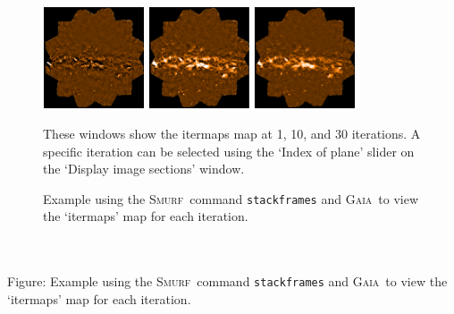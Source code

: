 \documentclass[twoside,11pt]{article}
\newcommand{\htmladdimg}[1]{}
\newenvironment{latexonly}{}{}
\newcommand{\xref}[3]{#1}
\renewcommand{\_}{\texttt{\symbol{95}}}
\newenvironment{fmpage}[1]{\begin{lrbox}{\fmbox}\begin{minipage}{#1}}{\end{minipage}\end{lrbox}\fbox{\usebox{\fmbox}}}
\newcommand{\gaia}{\xref{\textsc{Gaia}}{sun214}{}}
\newcommand{\smurf}{\xref{\textsc{Smurf}}{sun258}{}}
\begin{document}
\begin{latexonly}
\begin{figure}[ht!]
\begin{center}
\begin{fmpage}{0.95\linewidth}
\begin{minipage}[c]{0.65\linewidth}
\centering
\hspace{0.5mm}
\includegraphics[width=3cm, height=3cm]{sc21_iter1.eps}
\includegraphics[width=3cm, height=3cm]{sc21_iter2.eps}
\includegraphics[width=3cm, height=3cm]{sc21_iter31.eps}
\vspace{0.2cm}
\end{minipage}
\hspace{0.3cm}
\begin{minipage}[c]{0.29\linewidth}
These windows show the itermaps map at 1, 10, and 30 iterations. A
specific iteration can be selected using the `Index of plane' slider
on the `Display image sections' window.
\vspace{0.2cm}
\end{minipage}

\end{fmpage}
\end{center}
\caption{\small Example using the \smurf\ command \texttt{stackframes} and
\gaia\ to view the `itermaps' map for each iteration.}
\label{fig:stack}
\end{figure}
\end{latexonly}

\begin{htmlonly}
 \label{fig:stack} \htmladdimg{sc21_view_itermaps.png}
 \\ \\
 Figure: Example using the \smurf\ command \texttt{stackframes} and
 \gaia\ to view the `itermaps' map for each iteration.
\end{htmlonly}
\end{document}
